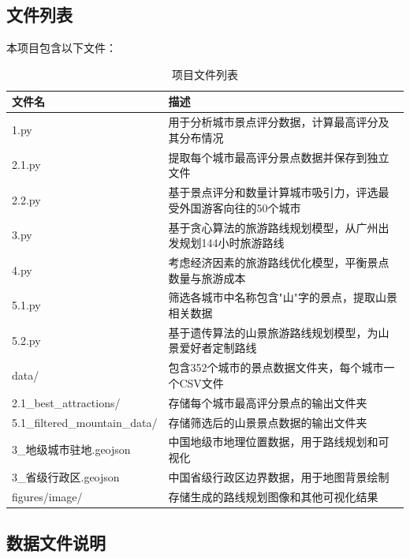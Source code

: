 \documentclass[withoutpreface,bwprint]{cumcmthesis} %
\begin{document}
\newpage %

\begin{appendices}

\section{文件列表}

本项目包含以下文件：

\begin{table}[H]
\centering
\caption{项目文件列表}
\label{tab:file_list}
\begin{tabular}{|p{5cm}|p{10cm}|}
\hline
\textbf{文件名} & \textbf{描述} \\
\hline
1.py & 用于分析城市景点评分数据，计算最高评分及其分布情况 \\
\hline
2.1.py & 提取每个城市最高评分景点数据并保存到独立文件 \\
\hline
2.2.py & 基于景点评分和数量计算城市吸引力，评选最受外国游客向往的50个城市 \\
\hline
3.py & 基于贪心算法的旅游路线规划模型，从广州出发规划144小时旅游路线 \\
\hline
4.py & 考虑经济因素的旅游路线优化模型，平衡景点数量与旅游成本 \\
\hline
5.1.py & 筛选各城市中名称包含"山"字的景点，提取山景相关数据 \\
\hline
5.2.py & 基于遗传算法的山景旅游路线规划模型，为山景爱好者定制路线 \\
\hline
data/ & 包含352个城市的景点数据文件夹，每个城市一个CSV文件 \\
\hline
2.1\_best\_attractions/ & 存储每个城市最高评分景点的输出文件夹 \\
\hline
5.1\_filtered\_mountain\_data/ & 存储筛选后的山景景点数据的输出文件夹 \\
\hline
3\_地级城市驻地.geojson & 中国地级市地理位置数据，用于路线规划和可视化 \\
\hline
3\_省级行政区.geojson & 中国省级行政区边界数据，用于地图背景绘制 \\
\hline
figures/image/ & 存储生成的路线规划图像和其他可视化结果 \\
\hline
\end{tabular}
\end{table}

\subsection{数据文件说明}


\end{appendices}
\end{document}
